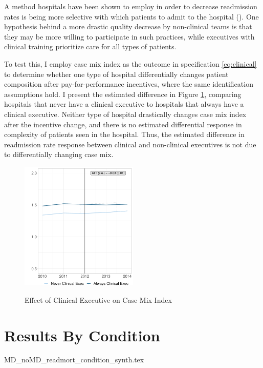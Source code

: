 \documentclass[12pt]{article}
\begin{document}
    A method hospitals have been shown to employ in order to decrease readmission rates is being more selective with which patients to admit to the hospital (\cite{gupta2021impacts}). One hypothesis behind a more drastic quality decrease by non-clinical teams is that they may be more willing to participate in such practices, while executives with clinical training prioritize care for all types of patients. 

    To test this, I employ case mix index as the outcome in specification \ref{eq:clinical} to determine whether one type of hospital differentially changes patient composition after pay-for-performance incentives, where the same identification assumptions hold. I present the estimated difference in Figure \ref{fig:main_cmi_clinical}, comparing hospitals that never have a clinical executive to hospitals that always have a clinical executive. Neither type of hospital drastically changes case mix index after the incentive change, and there is no estimated differential response in complexity of patients seen in the hospital. Thus, the estimated difference in readmission rate response between clinical and non-clinical executives is not due to differentially changing case mix. 

    \begin{figure}[ht!]
        \centering
        \caption{Effect of Clinical Executive on Case Mix Index}
        \includegraphics[width=0.5\textwidth]{Objects/cmi_md_nomd_synth_graph.pdf}
        \label{fig:main_cmi_clinical}
    \end{figure}


\section{Results By Condition}\label{app:condition}


{MD_noMD_readmort_condition_synth.tex}
\end{document}

